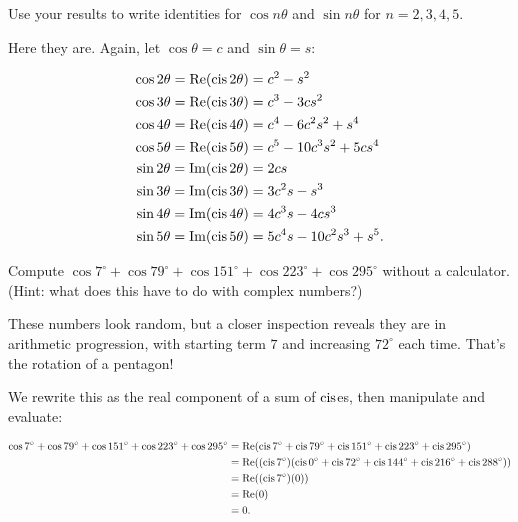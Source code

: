 \documentclass[../key.tex]{subfiles}
\newcommand{\cosdeg}[1] {\cos #1^\circ}
\newcommand{\cisdeg}[1] {\cis #1^\circ}
\begin{document}
\begin{inner_problem}
\item Use your results to write identities for $\cos n\theta$ and $\sin n\theta$ for $n=2,3,4,5$.
\end{inner_problem}

Here they are. Again, let $\cos\theta = c$ and $\sin\theta = s$:

\begin{align*}
\cos 2\theta = \operatorname{Re}(\operatorname{cis} 2\theta) &= c^2 - s^2 \\
\cos 3\theta = \operatorname{Re}(\operatorname{cis} 3\theta) &= c^3 - 3cs^2 \\
\cos 4\theta = \operatorname{Re}(\operatorname{cis} 4\theta) &= c^4 - 6c^2s^2 + s^4 \\
\cos 5\theta = \operatorname{Re}(\operatorname{cis} 5\theta) &= c^5 - 10c^3s^2 + 5cs^4 \\
\sin 2\theta = \operatorname{Im}(\operatorname{cis} 2\theta) &= 2cs \\
\sin 3\theta = \operatorname{Im}(\operatorname{cis} 3\theta) &= 3c^2s - s^3 \\
\sin 4\theta = \operatorname{Im}(\operatorname{cis} 4\theta) &= 4c^3s - 4cs^3 \\
\sin 5\theta = \operatorname{Im}(\operatorname{cis} 5\theta) &= 5c^4s - 10c^2s^3 + s^5. \\
\end{align*}

\begin{outer_problem}
\item Compute $\cosdeg{7} + \cosdeg{79} + \cosdeg{151} + \cosdeg{223} + \cosdeg{295}$ without a calculator. (Hint: what does this have to do with complex numbers?)
\end{outer_problem}

These numbers look random, but a closer inspection reveals they are in arithmetic progression, with starting term $7$ and increasing $72^\circ$ each time. That's the rotation of a pentagon!

We rewrite this as the real component of a sum of $\operatorname{cis}$es, then manipulate and evaluate:

\begin{align*}
\cosdeg{7} + \cosdeg{79} + \cosdeg{151} + \cosdeg{223} + \cosdeg{295} &= \Real(\cisdeg{7} + \cisdeg{79} +  \cisdeg{151} +  \cisdeg{223} +  \cisdeg{295}) \\
&= \Real((\cisdeg{7})(\cisdeg{0} + \cisdeg{72} + \cisdeg{144} + \cisdeg{216} + \cisdeg{288})) \\
&= \Real((\cisdeg{7})(0)) \\
&= \Real(0) \\
&= 0.
\end{align*}
\end{document}
